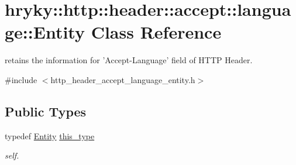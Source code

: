 \hypertarget{classhryky_1_1http_1_1header_1_1accept_1_1language_1_1_entity}{\section{hryky\-:\-:http\-:\-:header\-:\-:accept\-:\-:language\-:\-:Entity Class Reference}
\label{classhryky_1_1http_1_1header_1_1accept_1_1language_1_1_entity}
}


retains the information for 'Accept-\/\-Language' field of H\-T\-T\-P Header.  




{\ttfamily \#include $<$http\-\_\-header\-\_\-accept\-\_\-language\-\_\-entity.\-h$>$}

\subsection*{Public Types}
\begin{DoxyCompactItemize}
\item 
\hypertarget{classhryky_1_1http_1_1header_1_1accept_1_1language_1_1_entity_a545f9cf0cf53449ef3b6b5a6a1b47e6e}{typedef \hyperlink{classhryky_1_1http_1_1header_1_1accept_1_1language_1_1_entity}{Entity} \hyperlink{classhryky_1_1http_1_1header_1_1accept_1_1language_1_1_entity_a545f9cf0cf53449ef3b6b5a6a1b47e6e}{this\-\_\-type}}\label{classhryky_1_1http_1_1header_1_1accept_1_1language_1_1_entity_a545f9cf0cf53449ef3b6b5a6a1b47e6e}

\begin{DoxyCompactList}\small\item\em self. \end{DoxyCompactList}\end{DoxyCompactItemize}
